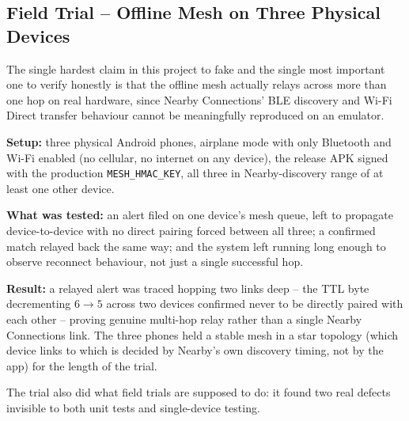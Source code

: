\documentclass[12pt,a4paper,oneside]{report}
\newcommand{\code}[1]{\texttt{#1}}
\begin{document}
\subsection{Field Trial -- Offline Mesh on Three Physical Devices}
\label{sec:field-trial}

The single hardest claim in this project to fake and the single most
important one to verify honestly is that the offline mesh actually
relays across more than one hop on real hardware, since Nearby
Connections' BLE discovery and Wi-Fi Direct transfer behaviour cannot be
meaningfully reproduced on an emulator.

\textbf{Setup:} three physical Android phones, airplane mode with only
Bluetooth and Wi-Fi enabled (no cellular, no internet on any device), the
release APK signed with the production \code{MESH\_HMAC\_KEY}, all three
in Nearby-discovery range of at least one other device.

\textbf{What was tested:} an alert filed on one device's mesh queue, left
to propagate device-to-device with no direct pairing forced between all
three; a confirmed match relayed back the same way; and the system left
running long enough to observe reconnect behaviour, not just a single
successful hop.

\textbf{Result:} a relayed alert was traced hopping two links deep -- the
TTL byte decrementing $6\rightarrow5$ across two devices confirmed never to
be directly paired with each other -- proving genuine multi-hop relay
rather than a single Nearby Connections link. The three phones held a
stable mesh in a star topology (which device links to which is decided by
Nearby's own discovery timing, not by the app) for the length of the
trial.

The trial also did what field trials are supposed to do: it found two real
defects invisible to both unit tests and single-device testing.
\end{document}
